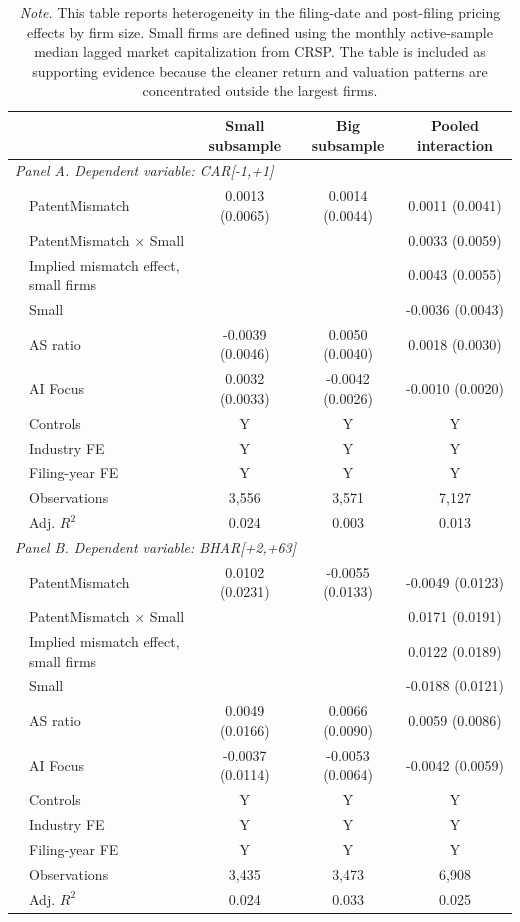 \begin{table}[!htbp]
\centering
\footnotesize
\caption{Size heterogeneity in filing-date and post-filing mismatch effects}
\label{tab:appendix_size_heterogeneity}
\begin{tabular}{llccc}
\hline
  && Small subsample & Big subsample & Pooled interaction \\
\hline
 \multicolumn{5}{l}{\textit{Panel A. Dependent variable: CAR[-1,+1]}}\\
 &PatentMismatch & 0.0013 (0.0065) & 0.0014 (0.0044) & 0.0011 (0.0041) \\
 &PatentMismatch × Small &  &  & 0.0033 (0.0059) \\
 &Implied mismatch effect, small firms &  &  & 0.0043 (0.0055) \\
 &Small &  &  & -0.0036 (0.0043) \\
 &AS ratio & -0.0039 (0.0046) & 0.0050 (0.0040) & 0.0018 (0.0030) \\
 &AI Focus & 0.0032 (0.0033) & -0.0042 (0.0026) & -0.0010 (0.0020) \\
 &Controls & Y & Y & Y \\
 &Industry FE & Y & Y & Y \\
 &Filing-year FE & Y & Y & Y \\
 &Observations & 3,556& 3,571& 7,127\\
 &Adj. $R^2$ & 0.024 & 0.003 & 0.013 \\
 \multicolumn{5}{l}{\textit{Panel B. Dependent variable: BHAR[+2,+63]}}\\
 &PatentMismatch & 0.0102 (0.0231) & -0.0055 (0.0133) & -0.0049 (0.0123) \\
 &PatentMismatch × Small &  &  & 0.0171 (0.0191) \\
 &Implied mismatch effect, small firms &  &  & 0.0122 (0.0189) \\
 &Small &  &  & -0.0188 (0.0121) \\
 &AS ratio & 0.0049 (0.0166) & 0.0066 (0.0090) & 0.0059 (0.0086) \\
 &AI Focus & -0.0037 (0.0114) & -0.0053 (0.0064) & -0.0042 (0.0059) \\
 &Controls & Y & Y & Y \\
 &Industry FE & Y & Y & Y \\
 &Filing-year FE & Y & Y & Y \\
 &Observations & 3,435& 3,473& 6,908\\
 &Adj. $R^2$ & 0.024 & 0.033 & 0.025 \\
\hline
\end{tabular}
\caption*{\footnotesize \textit{Note.} This table reports heterogeneity in the filing-date and post-filing pricing effects by firm size. Small firms are defined using the monthly active-sample median lagged market capitalization from CRSP. The table is included as supporting evidence because the cleaner return and valuation patterns are concentrated outside the largest firms.}
\end{table}
